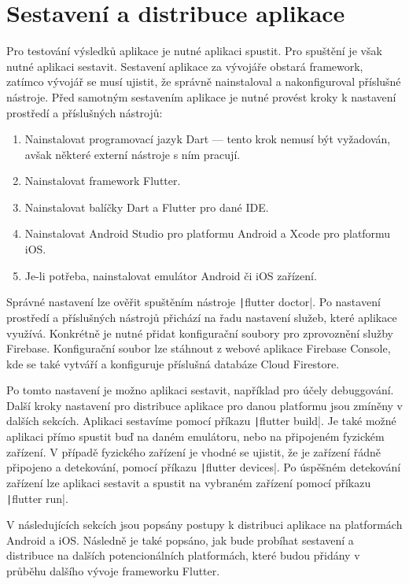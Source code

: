 \chapter{Sestavení a distribuce aplikace}
\label{chap:deployment}

Pro testování výsledků aplikace je nutné aplikaci spustit.
Pro spuštění je však nutné aplikaci sestavit.
Sestavení aplikace za vývojáře obstará framework,
zatímco vývojář se musí ujistit,
že správně nainstaloval a nakonfiguroval příslušné nástroje.
Před samotným sestavením aplikace je nutné provést kroky k nastavení prostředí
a příslušných nástrojů:

\begin{enumerate}
    \item Nainstalovat programovací jazyk Dart
    --- tento krok nemusí být vyžadován,
    avšak některé externí nástroje s ním pracují.
    \item Nainstalovat framework Flutter.
    \item Nainstalovat balíčky Dart a Flutter pro dané IDE.
    \item Nainstalovat Android Studio pro platformu Android
    a Xcode pro platformu iOS.
    \item Je-li potřeba, nainstalovat emulátor Android či iOS zařízení.
\end{enumerate}

Správné nastavení lze ověřit spuštěním nástroje
\texttt|flutter doctor|.
Po nastavení prostředí a příslušných nástrojů přichází na řadu nastavení služeb,
které aplikace využívá.
Konkrétně je nutné přidat konfigurační soubory pro zprovoznění služby Firebase.
Konfigurační soubor lze stáhnout z webové aplikace Firebase Console,
kde se také vytváří a konfiguruje příslušná databáze Cloud Firestore. 

Po tomto nastavení je možno aplikaci sestavit,
například pro účely debuggování.
Další kroky nastavení pro distribuce aplikace pro danou platformu jsou
zmíněny v dalších sekcích.
Aplikaci sestavíme pomocí příkazu \texttt|flutter build|.
Je také možné aplikaci přímo spustit buď na daném emulátoru,
nebo na připojeném fyzickém zařízení.
V případě fyzického zařízení je vhodné se ujistit,
že je zařízení řádně připojeno a detekování,
pomocí příkazu \texttt|flutter devices|.
Po úspěšném detekování zařízení lze aplikaci sestavit a spustit na vybraném
zařízení pomocí příkazu \texttt|flutter run|. 

V následujících sekcích jsou popsány postupy k distribuci aplikace na
platformách Android a iOS.
Následně je také popsáno,
jak bude probíhat sestavení a distribuce na dalších potencionálních
platformách,
které budou přidány v průběhu dalšího vývoje frameworku Flutter.




